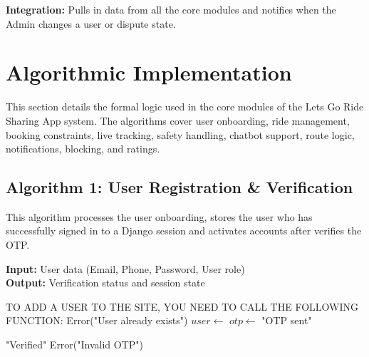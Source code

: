 \textbf{Integration:} Pulls in data from all the core modules and notifies when the Admin changes a user or dispute state.


\section{Algorithmic Implementation}

This section details the formal logic used in the core modules of the Lets Go Ride Sharing App system. The algorithms cover user onboarding, ride management, booking constraints, live tracking, safety handling, chatbot support, route logic, notifications, blocking, and ratings.

\subsection{Algorithm 1: User Registration \& Verification}

This algorithm processes the user onboarding, stores the user who has successfully signed in to a Django session and activates accounts after verifies the OTP.

\begin{breakablealgorithm}
\caption{This algorithm deals with the process of user registration and OTP verification.This algorithm is related to user registration and OTP verification.}
\textbf{Input:} User data (Email, Phone, Password, User role) \\
\textbf{Output:} Verification status and session state
\begin{algorithmic}[1]
\State TO ADD A USER TO THE SITE, YOU NEED TO CALL THE FOLLOWING FUNCTION:
        \State \Return Error("User already exists")
    \EndIf
    \State $user \gets$ 
    \State $otp \gets$ 
    \State {}
    \State {}
    \State \Return "OTP sent"
\EndFunction

        \State {}
        \State \Return "Verified"
    \Else
        \State \Return Error("Invalid OTP")
    \EndIf
\EndFunction
\end{algorithmic}
\end{breakablealgorithm}

